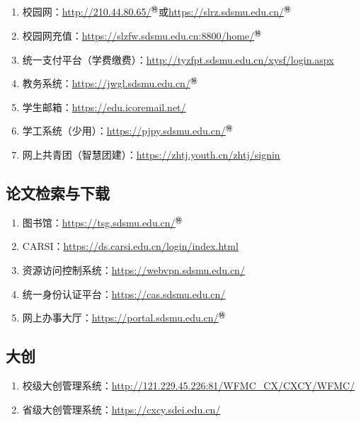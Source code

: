 \subsection[日常使用]{\textbf{}}
\begin{enumerate}
    \item 校园网：\uline{\href{http://210.44.80.65/}{http://210.44.80.65/}$^㊕$}或\uline{\href{https://slrz.sdsmu.edu.cn/}{https://slrz.sdsmu.edu.cn/}$^㊕$}
    \item 校园网充值：\uline{\href{https://slzfw.sdsmu.edu.cn:8800/home/}{https://slzfw.sdsmu.edu.cn:8800/home/}$^㊕$}
    \item 统一支付平台（学费缴费）：\uline{\href{http://tyzfpt.sdsmu.edu.cn/xysf/login.aspx}{http://tyzfpt.sdsmu.edu.cn/xysf/login.aspx}}
    \item 教务系统：\uline{\href{https://jwgl.sdsmu.edu.cn/}{https://jwgl.sdsmu.edu.cn/}$^㊕$}
    \item 学生邮箱：\uline{\href{https://edu.icoremail.net/}{https://edu.icoremail.net/}}
    \item 学工系统（少用）：\uline{\href{https://pjpy.sdsmu.edu.cn/}{https://pjpy.sdsmu.edu.cn/}$^㊕$}
    \item 网上共青团（智慧团建）：\uline{\href{https://zhtj.youth.cn/zhtj/signin}{https://zhtj.youth.cn/zhtj/signin}}
\end{enumerate}

\subsection[论文检索与下载]{论文检索与下载}
\begin{enumerate}
    \item 图书馆：\uline{\href{https://tsg.sdsmu.edu.cn/}{https://tsg.sdsmu.edu.cn/}$^㊕$}
    \item CARSI：\uline{\href{https://ds.carsi.edu.cn/login/index.html}{https://ds.carsi.edu.cn/login/index.html}}
    \item 资源访问控制系统：\uline{\href{https://webvpn.sdsmu.edu.cn/}{https://webvpn.sdsmu.edu.cn/}}
    \item 统一身份认证平台：\uline{\href{https://cas.sdsmu.edu.cn/}{https://cas.sdsmu.edu.cn/}}
    \item 网上办事大厅：\uline{\href{https://portal.sdsmu.edu.cn/}{https://portal.sdsmu.edu.cn/}$^㊕$}
\end{enumerate}

\subsection[大创]{大创\footnotemark}
\begin{enumerate}
    \item 校级大创管理系统：\uline{\href{http://121.229.45.226:81/WFMC\_CX/CXCY/WFMC/}{http://121.229.45.226:81/WFMC\_CX/CXCY/WFMC/}}
    \item 省级大创管理系统：\uline{\href{https://cxcy.sdei.edu.cn/}{https://cxcy.sdei.edu.cn/}}
\end{enumerate}

